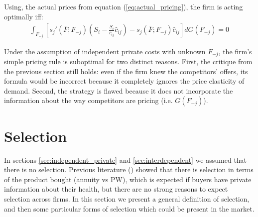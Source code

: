\documentclass[12pt]{article}
\theoremstyle{plain}
\theoremstyle{plain}
\begin{document}
Using, the actual prices from equation (\ref{eq:actual_pricing}), the firm is acting optimally iff: 
\begin{align}\label{eq:comparison2}
    \int_{F_{-j}} \left[s_j'(\bar{F}; F_{-j}) \left(S_{i}-\frac{S_{i}}{\bar{c}_{ij}}\hat{c}_{ij}\right)- s_j(\bar{F}; F_{-j}) \hat{c}_{ij}  \right]dG(F_{-j})=0
\end{align}   
 
 
Under the assumption of independent private  costs with unknown $F_{-j}$, the firm's simple pricing rule is suboptimal for two distinct reasons. First, the critique from the previous section still holds: even if the firm knew the competitors' offers, its formula would be incorrect because it completely ignores the price elasticity of demand. Second, the strategy is flawed because it does not incorporate the information about the way competitors are pricing (i.e. $G(F_{-j})$). 



 
 


\section{Selection}

In sections \ref{sec:independent_private} and \ref{sec:interdependent} we assumed that there is no selection. Previous literature (\cite{illanes_retirement_2019}) showed that there is selection in terms of the product bought (annuity vs  PW), which is expected if buyers have private information about their health, but there are no strong reasons to expect selection across firms. In this section we present a general definition of selection, and then some particular forms of selection which could be present in the market. 
\end{document}
